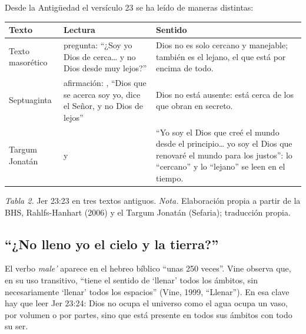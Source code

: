 Desde la Antigüedad el versículo 23 se ha leído de maneras distintas:

\begin{center}\small\renewcommand{\arraystretch}{1.22}
\begin{tabular}{@{}L{2.6cm}L{5.6cm}L{6.0cm}@{}}
\toprule
\textbf{Texto} & \textbf{Lectura} & \textbf{Sentido} \\ \midrule
Texto masorético & pregunta: ``¿Soy yo Dios de cerca\ldots{} y no Dios desde muy lejos?'' & Dios no es solo cercano y manejable; también es el lejano, el que está por encima de todo. \\
Septuaginta & afirmación: , ``Dios que se acerca soy yo, dice el Señor, y no Dios de lejos'' & Dios no está ausente: está cerca de los que obran en secreto. \\
Targum Jonatán &  y  & ``Yo soy el Dios que creé el mundo desde el principio\ldots{} yo soy el Dios que renovaré el mundo para los justos'': lo ``cercano'' y lo ``lejano'' se leen en el tiempo. \\
\bottomrule
\end{tabular}\par
{\footnotesize\color{gris}\textit{Tabla 2.} Jer 23:23 en tres textos antiguos. \textit{Nota.} Elaboración propia a partir de la BHS, Rahlfs-Hanhart (2006) y el Targum Jonatán (Sefaria); traducción propia.}
\end{center}


\subsection{“¿No lleno yo el cielo y la tierra?”}

El verbo  \emph{male'} aparece en el hebreo bíblico ``unas 250 veces''. Vine observa que, en su uso transitivo, ``tiene el sentido de `llenar' todos los ámbitos, sin necesariamente `llenar' todos los espacios'' (Vine, 1999, ``Llenar''). En esa clave hay que leer Jer 23:24: Dios no ocupa el universo como el agua ocupa un vaso, por volumen o por partes, sino que está presente en todos sus ámbitos con todo su ser.

